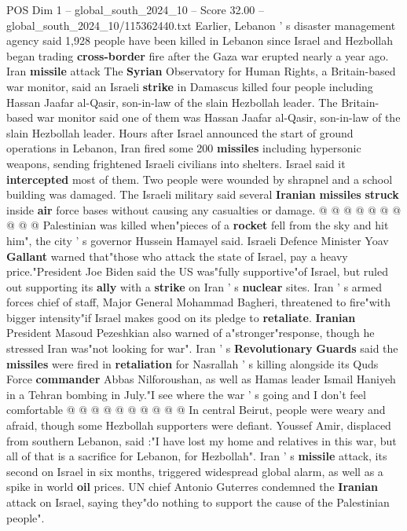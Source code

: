 \begin{textsample}{POS Dim 1 – global\_south\_2024\_10 – Score 32.00 – global\_south\_2024\_10/115362440.txt}
Earlier, Lebanon ' s disaster management agency said 1,928 people have been killed in Lebanon since Israel and Hezbollah began trading \textbf{cross-border} fire after the Gaza war erupted nearly a year ago.
Iran \textbf{missile} attack The \textbf{Syrian} Observatory for Human Rights, a Britain-based war monitor, said an Israeli \textbf{strike} in Damascus killed four people including Hassan Jaafar al-Qasir, son-in-law of the slain Hezbollah leader.
The Britain-based war monitor said one of them was Hassan Jaafar al-Qasir, son-in-law of the slain Hezbollah leader.
Hours after Israel announced the start of ground operations in Lebanon, Iran fired some 200 \textbf{missiles} including hypersonic weapons, sending frightened Israeli civilians into shelters.
Israel said it \textbf{intercepted} most of them.
Two people were wounded by shrapnel and a school building was damaged.
The Israeli military said several \textbf{Iranian} \textbf{missiles} \textbf{struck} inside \textbf{air} force bases without causing any casualties or damage. @ @ @ @ @ @ @ @ @ @ Palestinian was killed when"pieces of a \textbf{rocket} fell from the sky and hit him", the city ' s governor Hussein Hamayel said.
Israeli Defence Minister Yoav \textbf{Gallant} warned that"those who attack the state of Israel, pay a heavy price."President Joe Biden said the US was"fully supportive"of Israel, but ruled out supporting its \textbf{ally} with a \textbf{strike} on Iran ' s \textbf{nuclear} sites.
Iran ' s armed forces chief of staff, Major General Mohammad Bagheri, threatened to fire"with bigger intensity"if Israel makes good on its pledge to \textbf{retaliate}. \textbf{Iranian} President Masoud Pezeshkian also warned of a"stronger"response, though he stressed Iran was"not looking for war".
Iran ' s \textbf{Revolutionary} \textbf{Guards} said the \textbf{missiles} were fired in \textbf{retaliation} for Nasrallah ' s killing alongside its Quds Force \textbf{commander} Abbas Nilforoushan, as well as Hamas leader Ismail Haniyeh in a Tehran bombing in July."I see where the war ' s going and I don't feel comfortable @ @ @ @ @ @ @ @ @ @ In central Beirut, people were weary and afraid, though some Hezbollah supporters were defiant.
Youssef Amir, displaced from southern Lebanon, said :"I have lost my home and relatives in this war, but all of that is a sacrifice for Lebanon, for Hezbollah".
Iran ' s \textbf{missile} attack, its second on Israel in six months, triggered widespread global alarm, as well as a spike in world \textbf{oil} prices.
UN chief Antonio Guterres condemned the \textbf{Iranian} attack on Israel, saying they"do nothing to support the cause of the Palestinian people".

\end{textsample}
